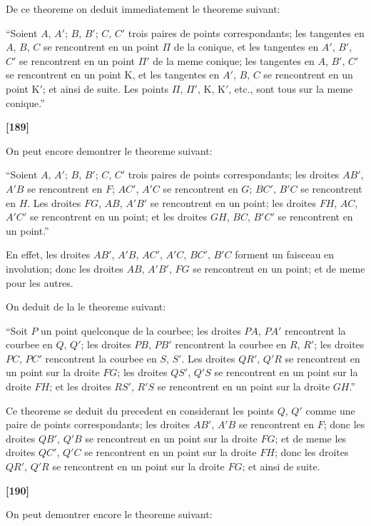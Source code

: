 \documentclass[11pt,a4paper]{article}
\begin{document}
De ce theoreme on deduit immediatement le theoreme suivant:

``Soient $A$, $A'$; $B$, $B'$; $C$, $C'$ trois paires de points correspondants; les tangentes
en $A$, $B$, $C$ se rencontrent en un point $\Pi$ de la conique, et les tangentes en $A'$, $B'$, $C'$
se rencontrent en un point $\Pi'$ de la meme conique; les tangentes en $A$, $B'$, $C'$ se
rencontrent en un point $\mathrm{K}$, et les tangentes en $A'$, $B$, $C$ se rencontrent en un point $\mathrm{K}'$;
et ainsi de suite. Les points $\Pi$, $\Pi'$, $\mathrm{K}$, $\mathrm{K}'$, etc., sont tous sur la meme conique.''

\textbf{[189]}

On peut encore demontrer le theoreme suivant:

``Soient $A$, $A'$; $B$, $B'$; $C$, $C'$ trois paires de points correspondants; les droites
$AB'$, $A'B$ se rencontrent en $F$; $AC'$, $A'C$ se rencontrent en $G$; $BC'$, $B'C$ se rencontrent
en $H$. Les droites $FG$, $AB$, $A'B'$ se rencontrent en un point; les droites $FH$, $AC$, $A'C'$
se rencontrent en un point; et les droites $GH$, $BC$, $B'C'$ se rencontrent en un point.''

En effet, les droites $AB'$, $A'B$, $AC'$, $A'C$, $BC'$, $B'C$ forment un faisceau en involution;
donc les droites $AB$, $A'B'$, $FG$ se rencontrent en un point; et de meme pour les autres.

On deduit de la le theoreme suivant:

``Soit $P$ un point quelconque de la courbee; les droites $PA$, $PA'$ rencontrent la
courbee en $Q$, $Q'$; les droites $PB$, $PB'$ rencontrent la courbee en $R$, $R'$; les droites $PC$,
$PC'$ rencontrent la courbee en $S$, $S'$. Les droites $QR'$, $Q'R$ se rencontrent en un point
sur la droite $FG$; les droites $QS'$, $Q'S$ se rencontrent en un point sur la droite $FH$; et
les droites $RS'$, $R'S$ se rencontrent en un point sur la droite $GH$.''

Ce theoreme se deduit du precedent en considerant les points $Q$, $Q'$ comme une
paire de points correspondants; les droites $AB'$, $A'B$ se rencontrent en $F$; donc les
droites $QB'$, $Q'B$ se rencontrent en un point sur la droite $FG$; et de meme les droites
$QC'$, $Q'C$ se rencontrent en un point sur la droite $FH$; donc les droites $QR'$, $Q'R$ se
rencontrent en un point sur la droite $FG$; et ainsi de suite.

\textbf{[190]}

On peut demontrer encore le theoreme suivant:
\end{document}

